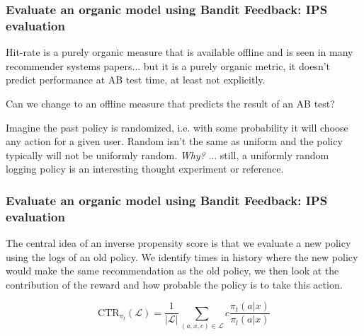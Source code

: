 \begin{frame}
  \frametitle{Evaluate an organic model using Bandit Feedback: IPS evaluation}

Hit-rate is a purely organic measure that is available offline and is seen in many recommender systems papers...  \pause but it is a purely organic metric, it doesn't predict performance at AB test time, at least not explicitly.

\pause

Can we change to an offline measure that predicts the result of an AB test?

\pause

Imagine the past policy is randomized, i.e. with some probability it will choose any action for a given user.  \pause Random isn't the same as uniform and the policy typically will not be uniformly random. \pause \emph{Why?} \pause ... still, a uniformly random logging policy is an interesting thought experiment or reference.

\end{frame}

\begin{frame}
  \frametitle{Evaluate an organic model using Bandit Feedback: IPS evaluation}

The central idea of an inverse propensity score is that we evaluate a new policy using the logs of an old policy.  \pause We identify times in history where the new policy would make the same recommendation as the old policy, we then look at the contribution of the reward and how probable the policy is to take this action. 

\[
\text{CTR}_{\pi_t}(\mathcal{L}) = \frac{1}{|\mathcal{L}|}\sum_{(a,x,c) \in \mathcal {L}} c \frac{\pi_t(a|x)}{\pi_l(a|x)}
\]

\end{frame}


